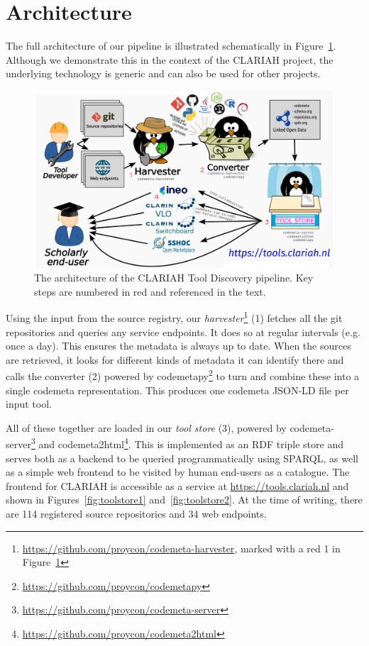 \documentclass[a4paper,11pt]{article}
\begin{document}
\section{Architecture}

The full architecture of our pipeline is illustrated schematically in
Figure~\ref{fig:architecture}. Although we demonstrate this in the context of the
CLARIAH project, the underlying technology is generic and can also be used for
other projects.

\begin{figure}[h]
\begin{center}
\includegraphics[width=14.0cm]{architecture.png}
\caption{The architecture of the CLARIAH Tool Discovery pipeline. Key steps are numbered in red and referenced in the text.}
\label{fig:architecture}
\end{center}
\end{figure}

Using the input from the source registry, our
\emph{harvester}\footnote{\url{https://github.com/proycon/codemeta-harvester}, marked with a red 1 in Figure~\ref{fig:architecture}} (1) \citep{CODEMETAHARVESTER} fetches all the git
repositories and queries any service endpoints. It does so at regular intervals
(e.g. once a day). This ensures the metadata is always up to date. When the
sources are retrieved, it looks for different kinds of metadata it can identify
there and calls the converter (2) powered by codemetapy\footnote{\url{https://github.com/proycon/codemetapy}} \citep{CODEMETAPY}
to turn and combine these into a single codemeta representation. This produces
one codemeta JSON-LD file per input tool. 

All of these together are loaded in our \emph{tool store} (3), powered by codemeta-server\footnote{\url{https://github.com/proycon/codemeta-server}} \citep{CODEMETASERVER} and codemeta2html\footnote{\url{https://github.com/proycon/codemeta2html}}. This is
implemented as an RDF triple store and serves both as a backend to be queried
programmatically using SPARQL, as well as a simple web frontend to be visited
by human end-users as a catalogue. The frontend for CLARIAH is
accessible as a service at \url{https://tools.clariah.nl} and shown in 
Figures~\ref{fig:toolstore1} and~\ref{fig:toolstore2}.
At the time of writing, there are 114 registered source repositories and 34 web endpoints.
\end{document}
